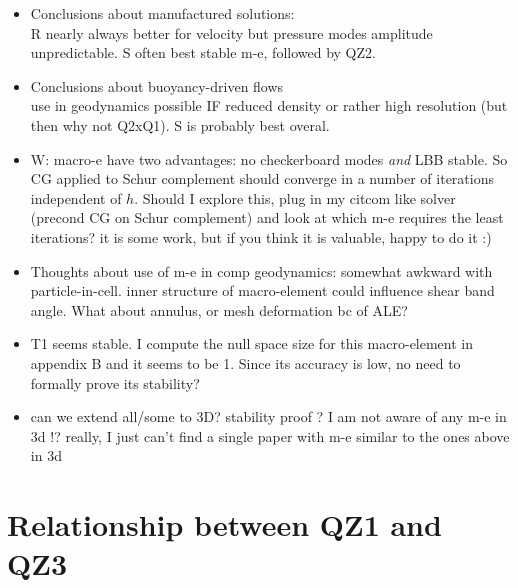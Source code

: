 \documentclass[a4paper,12pt]{article}
\begin{document}
\begin{itemize}
\item Conclusions about manufactured solutions:\\
R nearly always better for velocity but pressure modes amplitude unpredictable.
S often best stable m-e, followed by QZ2.

\item Conclusions about buoyancy-driven flows\\
use in geodynamics possible IF reduced density or rather high resolution (but then why not Q2xQ1). 
S is probably best overal.

\item
{\color{blue} W: macro-e have two advantages: no checkerboard modes {\it and} LBB stable. 
So CG applied to Schur complement should converge in a number of iterations independent of $h$.
Should I explore this, plug in my citcom like solver (precond CG on Schur complement)
and look at which m-e requires the least iterations? it is some work, but if you think
it is valuable, happy to do it :)}

\item 
Thoughts about use of m-e in comp geodynamics: 
somewhat awkward with particle-in-cell. inner structure of macro-element could influence shear band angle. 
What about annulus, or mesh deformation bc of ALE?

\item T1 seems stable. I compute the null space size for this macro-element in appendix B
and it seems to be 1. Since its accuracy is low, no need to formally prove its stability?
 
\item can we extend all/some to 3D? stability proof ? I am not aware of any m-e in 3d !?
really, I just can't find a single paper with m-e similar to the ones above in 3d

\end{itemize}







\printbibliography

\appendix

\section{Relationship between QZ1 and QZ3}
\end{document}
